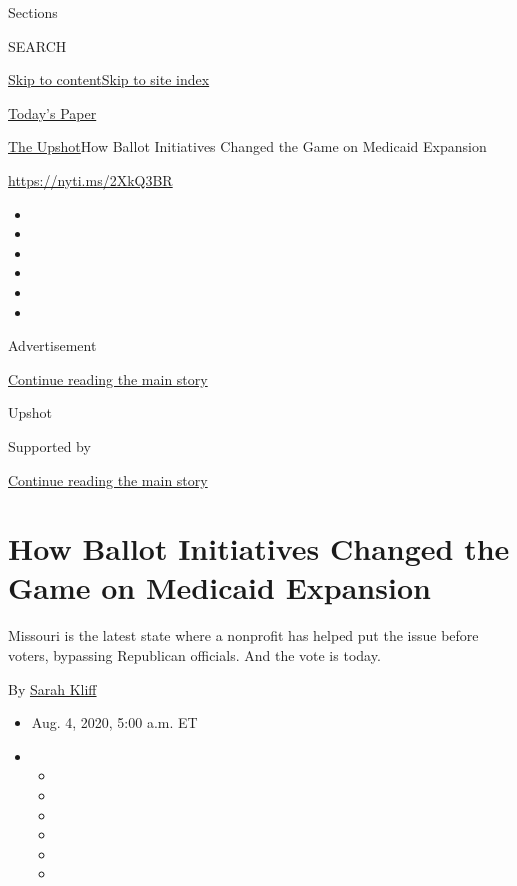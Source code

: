 Sections

SEARCH

\protect\hyperlink{site-content}{Skip to
content}\protect\hyperlink{site-index}{Skip to site index}

\href{https://myaccount.nytimes3xbfgragh.onion/auth/login?response_type=cookie\&client_id=vi}{}

\href{https://www.nytimes3xbfgragh.onion/section/todayspaper}{Today's
Paper}

\href{/section/upshot}{The Upshot}\textbar{}How Ballot Initiatives
Changed the Game on Medicaid Expansion

\url{https://nyti.ms/2XkQ3BR}

\begin{itemize}
\item
\item
\item
\item
\item
\item
\end{itemize}

Advertisement

\protect\hyperlink{after-top}{Continue reading the main story}

Upshot

Supported by

\protect\hyperlink{after-sponsor}{Continue reading the main story}

\hypertarget{how-ballot-initiatives-changed-the-game-on-medicaid-expansion}{%
\section{How Ballot Initiatives Changed the Game on Medicaid
Expansion}\label{how-ballot-initiatives-changed-the-game-on-medicaid-expansion}}

Missouri is the latest state where a nonprofit has helped put the issue
before voters, bypassing Republican officials. And the vote is today.

By \href{https://www.nytimes3xbfgragh.onion/by/sarah-kliff}{Sarah Kliff}

\begin{itemize}
\item
  Aug. 4, 2020, 5:00 a.m. ET
\item
  \begin{itemize}
  \item
  \item
  \item
  \item
  \item
  \item
  \end{itemize}
\end{itemize}

